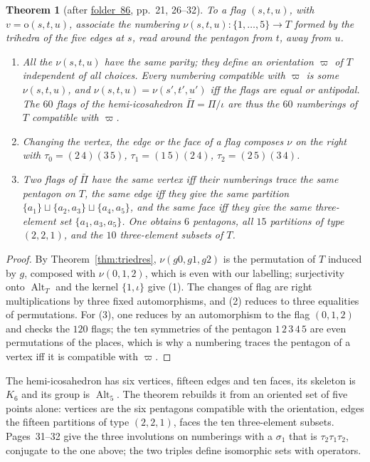 \documentclass[11pt,a4paper]{amsart}
\newtheorem{theorem}{Theorem}[section]
\theoremstyle{definition}
\theoremstyle{remark}
\newcommand{\Alt}{\operatorname{Alt}}
\newcommand{\fac}[1]{\href{https://grothendieck.umontpellier.fr/#1.pdf}{folder~#1}}
\begin{document}
\begin{theorem}[after \fac{86}, pp.~21, 26--32]\label{thm:hemi}
To a flag $(s, t, u)$, with $v = \mathrm o(s, t, u)$, associate the numbering $\nu(s, t, u)\colon \{1, \dots, 5\} \to T$ formed by the trihedra of the five edges at $s$, read around the pentagon from $t$, away from $u$.
\begin{enumerate}
\item All the $\nu(s, t, u)$ have the same parity; they define an orientation $\varpi$ of $T$ independent of all choices. Every numbering compatible with $\varpi$ is some $\nu(s, t, u)$, and $\nu(s, t, u) = \nu(s', t', u')$ iff the flags are equal or antipodal. The $60$ flags of the hemi-icosahedron $\bar\Pi = \Pi/\iota$ are thus the $60$ numberings of $T$ compatible with $\varpi$.
\item Changing the vertex, the edge or the face of a flag composes $\nu$ on the right with $\tau_0 = (2\,4)(3\,5)$, $\tau_1 = (1\,5)(2\,4)$, $\tau_2 = (2\,5)(3\,4)$.
\item Two flags of $\bar\Pi$ have the same vertex iff their numberings trace the same pentagon on $T$, the same edge iff they give the same partition $\{a_1\} \sqcup \{a_2, a_3\} \sqcup \{a_4, a_5\}$, and the same face iff they give the same three-element set $\{a_1, a_3, a_5\}$. One obtains $6$ pentagons, all $15$ partitions of type $(2,2,1)$, and the $10$ three-element subsets of $T$.
\end{enumerate}
\end{theorem}

\begin{proof}
By Theorem~\ref{thm:triedres}, $\nu(g0, g1, g2)$ is the permutation of $T$ induced by $g$, composed with $\nu(0, 1, 2)$, which is even with our labelling; surjectivity onto $\Alt_T$ and the kernel $\{1, \iota\}$ give (1). The changes of flag are right multiplications by three fixed automorphisms, and (2) reduces to three equalities of permutations. For (3), one reduces by an automorphism to the flag $(0, 1, 2)$ and checks the $120$ flags; the ten symmetries of the pentagon $1\,2\,3\,4\,5$ are even permutations of the places, which is why a numbering traces the pentagon of a vertex iff it is compatible with $\varpi$.
\end{proof}

The hemi-icosahedron has six vertices, fifteen edges and ten faces, its skeleton is $K_6$ and its group is $\Alt_5$. The theorem rebuilds it from an oriented set of five points alone: vertices are the six pentagons compatible with the orientation, edges the fifteen partitions of type $(2,2,1)$, faces the ten three-element subsets. Pages~31--32 give the three involutions on numberings with a $\sigma_1$ that is $\tau_2\tau_1\tau_2$, conjugate to the one above; the two triples define isomorphic sets with operators.
\end{document}
